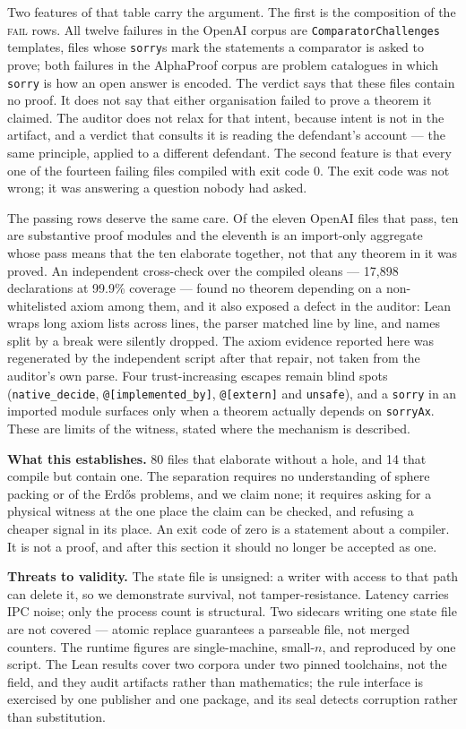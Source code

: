 \documentclass[conference]{IEEEtran}
\begin{document}
Two features of that table carry the argument. The first is the composition of the
\textsc{fail} rows. All twelve failures in the OpenAI corpus are
\texttt{ComparatorChallenges} templates, files whose \texttt{sorry}s mark the
statements a comparator is asked to prove; both failures in the AlphaProof corpus
are problem catalogues in which \texttt{sorry} is how an open answer is encoded.
The verdict says that these files contain no proof. It does not say that either
organisation failed to prove a theorem it claimed. The auditor does not relax for
that intent, because intent is not in the artifact, and a verdict that consults
it is reading the defendant's account --- the same principle, applied to a
different defendant. The second feature is that every one of the fourteen failing
files compiled with exit code $0$. The exit code was not wrong; it was answering
a question nobody had asked.

The passing rows deserve the same care. Of the eleven OpenAI files that pass, ten
are substantive proof modules and the eleventh is an import-only aggregate whose
pass means that the ten elaborate together, not that any theorem in it was
proved. An independent cross-check over the compiled oleans --- 17{,}898
declarations at 99.9\% coverage --- found no theorem depending on a
non-whitelisted axiom among them, and it also exposed a defect in the auditor:
Lean wraps long axiom lists across lines, the parser matched line by line, and
names split by a break were silently dropped. The axiom evidence reported here
was regenerated by the independent script after that repair, not taken from the
auditor's own parse. Four trust-increasing escapes remain blind spots
(\texttt{native\_decide}, \texttt{@[implemented\_by]}, \texttt{@[extern]} and
\texttt{unsafe}), and a \texttt{sorry} in an imported module surfaces only when
a theorem actually depends on \texttt{sorryAx}. These are limits of the witness,
stated where the mechanism is described.

\textbf{What this establishes.}
80 files that elaborate without a hole, and 14 that compile but contain one. The
separation requires no understanding of sphere packing or of the Erd\H{o}s
problems, and we claim none; it requires asking for a physical witness at the one
place the claim can be checked, and refusing a cheaper signal in its place. An
exit code of zero is a statement about a compiler. It is not a proof, and after
this section it should no longer be accepted as one.

\textbf{Threats to validity.}
The state file is unsigned: a writer with access to that path can delete it, so
we demonstrate survival, not tamper-resistance. Latency carries IPC noise; only
the process count is structural. Two sidecars writing one state file are not
covered --- atomic replace guarantees a parseable file, not merged counters. The
runtime figures are single-machine, small-$n$, and reproduced by one script. The
Lean results cover two corpora under two pinned toolchains, not the field, and
they audit artifacts rather than mathematics; the rule interface is exercised by
one publisher and one package, and its seal detects corruption rather than
substitution.
\end{document}
